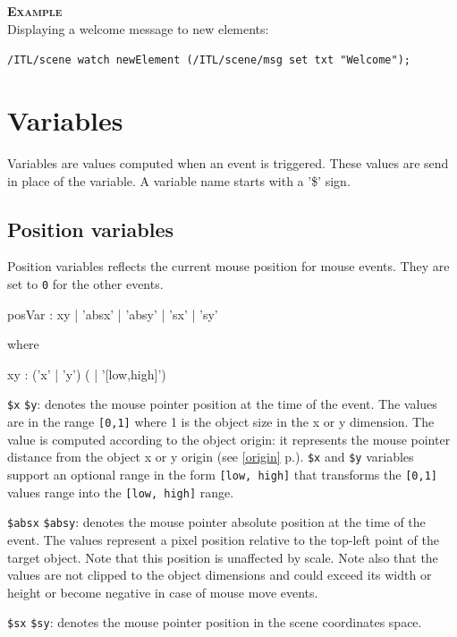 \documentclass[a4paper,twoside]{report}
\newcommand{\sublevel}[1]	{\section{#1}}
\newcommand{\subsublevel}[1]	{\subsection{#1}}
\newcommand{\fullref}[1]	{\ref{#1} p.\pageref{#1}}
\newcommand{\OSC}[1]		{\texttt{#1}}
\newcommand{\values}[1]		{\texttt{#1}}
\newcommand{\example}		{\textbf{\hspace{-1.5cm}\textbf{\textsc{Example }}}}
\let\olditemize\itemize
\let\oldenditemize\enditemize
\renewenvironment{itemize} 	{\olditemize \setlength{\itemsep}{1mm}}{\oldenditemize}
\newcommand{\sample}	[1]			{\vspace{-2mm}\begin{center}\colorbox{mygrey}{
								\begin{minipage}[t]{0.9\columnwidth} 
								{\small \texttt{#1}}
								\end{minipage}}\end{center}}
\begin{document}
\example \\
Displaying a welcome message to new elements:
\sample{/ITL/scene watch newElement (/ITL/scene/msg set txt "Welcome");}

\sublevel{Variables}
\label{interactvar}

Variables are values computed when an event is triggered. These values are send in place of the variable. A variable name starts with a '\$' sign. 

\subsublevel{Position variables}
\label{posvar}

Position variables reflects the current mouse position for mouse events. They are set to \values{0} for the other events. 

\begin{rail} 
posVar : xy | 'absx' | 'absy' | 'sx' | 'sy' 
\end{rail}

where
\begin{rail} 
xy : ('x' | 'y') ( | '[low,high]') 
\end{rail}

\begin{itemize}
\item \OSC{\$x} \OSC{\$y}: denotes the mouse pointer position at the time of the event. The values are in the range \values{[0,1]} where 1 is the object size in the x or y dimension. The value is computed according to the object origin: it represents the mouse pointer distance from the object x or y origin (see \fullref{origin}). \OSC{\$x} and \OSC{\$y} variables support an optional range in the form \OSC{[low, high]} that transforms the \values{[0,1]}  values range into the \values{[low, high]} range.

\item \OSC{\$absx} \OSC{\$absy}: denotes the mouse pointer absolute position at the time of the event. The values represent a pixel position relative to the top-left point of the target object. Note that this position is unaffected by scale. 
Note also that the values are not clipped to the object dimensions and could exceed its width or height or become negative in case of mouse move events.

\item \OSC{\$sx} \OSC{\$sy}: denotes the mouse pointer position in the scene coordinates space. 
\end{itemize}
\end{document}
